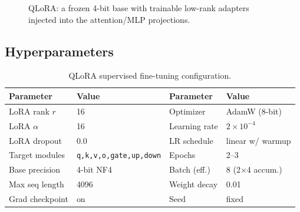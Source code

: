 \documentclass[11pt,a4paper]{article}
\begin{document}
\begin{figure}[h]
\centering
{}
\caption{QLoRA: a frozen 4-bit base with trainable low-rank adapters injected into the attention/MLP projections.}
\end{figure}

\subsection{Hyperparameters}
\begin{table}[h]
\centering\small
\begin{tabular}{@{}ll l l@{}}
\toprule
\textbf{Parameter} & \textbf{Value} & \textbf{Parameter} & \textbf{Value}\\
\midrule
LoRA rank $r$ & 16 & Optimizer & AdamW (8-bit)\\
LoRA $\alpha$ & 16 & Learning rate & $2\times10^{-4}$\\
LoRA dropout & 0.0 & LR schedule & linear w/ warmup\\
Target modules & \texttt{q,k,v,o,gate,up,down} & Epochs & 2--3\\
Base precision & 4-bit NF4 & Batch (eff.) & 8 (2$\times$4 accum.)\\
Max seq length & 4096 & Weight decay & 0.01\\
Grad checkpoint & on & Seed & fixed\\
\bottomrule
\end{tabular}
\caption{QLoRA supervised fine-tuning configuration.}
\end{table}

\end{document}
